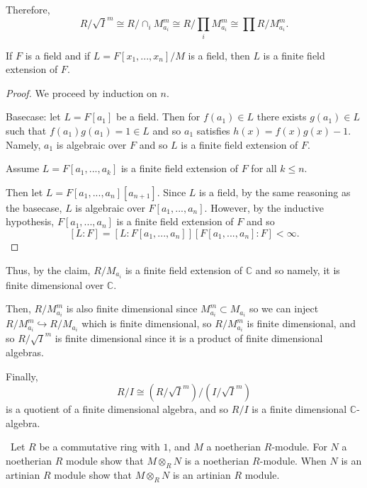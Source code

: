 \documentclass[12pt]{AlgebraQual}
\begin{document}
\begin{solution}
Therefore, $$R/\sqrt{I}^m\cong R/\cap_iM_{a_i}^m\cong R/\prod_iM_{a_i}^m\cong \prod R/M_{a_i}^m.$$

\begin{claim} If $F$ is a field and if $L=F[x_1,...,x_n]/M$ is a field, then $L$ is a finite field extension of $F$.
\begin{proof} We proceed by induction on $n.$

Basecase: let $L=F[a_1]$ be a field. Then for $f(a_1)\in L$ there exists $g(a_1)\in L$ such that $f(a_1)g(a_1)=1\in L$ and so $a_1$ satisfies $h(x)=f(x)g(x)-1$. Namely, $a_1$ is algebraic over $F$ and so $L$ is a finite field extension of $F.$

Assume $L=F[a_1,...,a_k]$ is a finite field extension of $F$ for all $k\le n$.

Then let $L=F[a_1,...,a_n][a_{n+1}]$. Since $L$ is a field, by the same reasoning as the basecase, $L$ is algebraic over $F[a_1,...,a_n]$. However, by the inductive hypothesis, $F[a_1,...,a_n]$ is a finite field extension of $F$ and so $$[L:F]=[L:F[a_1,...,a_n]][F[a_1,...,a_n]:F]<\infty.$$
\end{proof}
\end{claim}

Thus, by the claim, $R/M_{a_i}$ is a finite field extension of $\mathbb{C}$ and so namely, it is finite dimensional over $\mathbb{C}$.

Then, $R/M_{a_i}^m$ is also finite dimensional since $M_{a_i}^m\subset M_{a_i}$ so we can inject $R/M_{a_i}^m\hookrightarrow R/M_{a_i}$ which is finite dimensional, so $R/M_{a_i}^m$ is finite dimensional, and so $R/\sqrt{I}^m$ is finite dimensional since it is a product of finite dimensional algebras.

Finally, $$R/I\cong (R/\sqrt{I}^m)/(I/\sqrt{I}^m)$$ is a quotient of a finite dimensional algebra, and so $R/I$ is a finite dimensional $\mathbb{C}$-algebra.
\end{solution}
\newpage


\begin{problem} $\,$
Let $R$ be a commutative ring with $1$, and $M$ a noetherian $R$-module. For $N$ a noetherian $R$ module show that $M\otimes_R N$ is a noetherian $R$-module. When $N$ is an artinian $R$ module show that $M\otimes_RN$ is an artinian $R$ module.
\end{problem}
\end{document}
